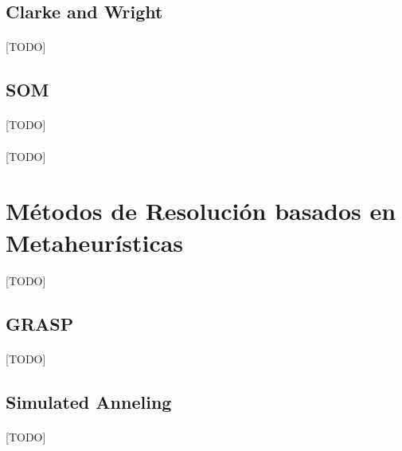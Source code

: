 \documentclass{subfiles}
\begin{document}
      \subsection{Clarke and Wright}
      \label{sec:solving_clarke_and_wright}

        \paragraph{}
        [TODO]

      \subsection{SOM}
      \label{sec:solving_som}

        \paragraph{}
        [TODO]

      \paragraph{}
      [TODO]

    \section{Métodos de Resolución basados en Metaheurísticas}
    \label{sec:solving_metaheuristics}

      \paragraph{}
      [TODO]

      \subsection{GRASP}
      \label{sec:solving_grasp}

        \paragraph{}
        [TODO]

      \subsection{Simulated Anneling}
      \label{sec:solving_simulated_anneling}

        \paragraph{}
        [TODO]
\end{document}
